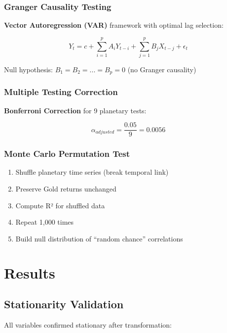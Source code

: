 \documentclass[
  11pt,
  a4paper,
  oneside,
  openany]{article}
\providecommand{\tightlist}{%
  \setlength{\itemsep}{0pt}\setlength{\parskip}{0pt}}\usepackage{longtable,booktabs,array}
\begin{document}
\subsubsection{Granger Causality
Testing}\label{granger-causality-testing}

\textbf{Vector Autoregression (VAR)} framework with optimal lag
selection:

\[
Y_t = c + \sum_{i=1}^{p} A_i Y_{t-i} + \sum_{j=1}^{p} B_j X_{t-j} + \epsilon_t
\]

Null hypothesis: \(B_1 = B_2 = ... = B_p = 0\) (no Granger causality)

\subsubsection{Multiple Testing
Correction}\label{multiple-testing-correction}

\textbf{Bonferroni Correction} for 9 planetary tests:

\[
\alpha_{adjusted} = \frac{0.05}{9} = 0.0056
\]

\subsubsection{Monte Carlo Permutation
Test}\label{monte-carlo-permutation-test}

\begin{enumerate}
\def\labelenumi{\arabic{enumi}.}
\tightlist
\item
  Shuffle planetary time series (break temporal link)
\item
  Preserve Gold returns unchanged
\item
  Compute R² for shuffled data
\item
  Repeat 1,000 times
\item
  Build null distribution of ``random chance'' correlations
\end{enumerate}

\section{Results}\label{results}

\subsection{Stationarity Validation}\label{stationarity-validation}

All variables confirmed stationary after transformation:
\end{document}
